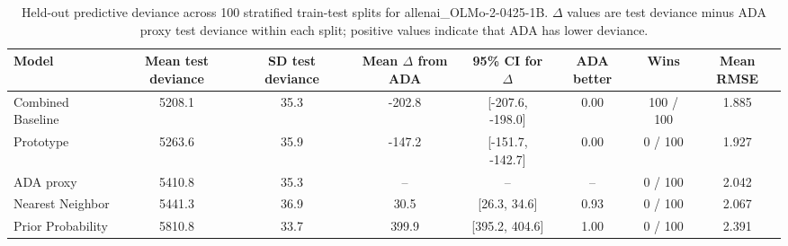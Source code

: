 \begin{table}

\caption{\label{tab:repeated-split-deviance-allenai-olmo-2-0425-1b}Held-out predictive deviance across 100 stratified train-test splits for allenai_OLMo-2-0425-1B. $\Delta$ values are test deviance minus ADA proxy test deviance within each split; positive values indicate that ADA has lower deviance.}
\centering
\begin{tabular}[t]{lccccccc}
\toprule
Model & Mean test deviance & SD test deviance & Mean $\Delta$ from ADA & 95\% CI for $\Delta$ & ADA better & Wins & Mean RMSE\\
\midrule
Combined Baseline & 5208.1 & 35.3 & -202.8 & {}[-207.6, -198.0] & 0.00 & 100 / 100 & 1.885\\
Prototype & 5263.6 & 35.9 & -147.2 & {}[-151.7, -142.7] & 0.00 & 0 / 100 & 1.927\\
ADA proxy & 5410.8 & 35.3 & -- & -- & -- & 0 / 100 & 2.042\\
Nearest Neighbor & 5441.3 & 36.9 & 30.5 & {}[26.3, 34.6] & 0.93 & 0 / 100 & 2.067\\
Prior Probability & 5810.8 & 33.7 & 399.9 & {}[395.2, 404.6] & 1.00 & 0 / 100 & 2.391\\
\bottomrule
\end{tabular}
\end{table}

